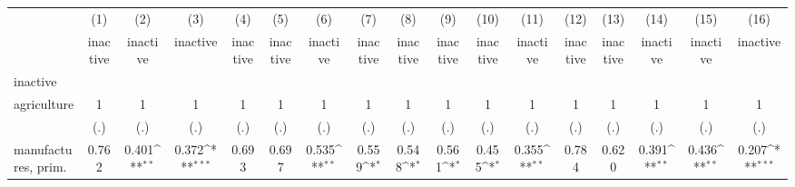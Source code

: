 {
\def\sym#1{\ifmmode^{#1}\else\(^{#1}\)\fi}
\begin{tabular}{l*{16}{c}}
\hline\hline
                    &\multicolumn{1}{c}{(1)}&\multicolumn{1}{c}{(2)}&\multicolumn{1}{c}{(3)}&\multicolumn{1}{c}{(4)}&\multicolumn{1}{c}{(5)}&\multicolumn{1}{c}{(6)}&\multicolumn{1}{c}{(7)}&\multicolumn{1}{c}{(8)}&\multicolumn{1}{c}{(9)}&\multicolumn{1}{c}{(10)}&\multicolumn{1}{c}{(11)}&\multicolumn{1}{c}{(12)}&\multicolumn{1}{c}{(13)}&\multicolumn{1}{c}{(14)}&\multicolumn{1}{c}{(15)}&\multicolumn{1}{c}{(16)}\\
                    &\multicolumn{1}{c}{inactive}&\multicolumn{1}{c}{inactive}&\multicolumn{1}{c}{inactive}&\multicolumn{1}{c}{inactive}&\multicolumn{1}{c}{inactive}&\multicolumn{1}{c}{inactive}&\multicolumn{1}{c}{inactive}&\multicolumn{1}{c}{inactive}&\multicolumn{1}{c}{inactive}&\multicolumn{1}{c}{inactive}&\multicolumn{1}{c}{inactive}&\multicolumn{1}{c}{inactive}&\multicolumn{1}{c}{inactive}&\multicolumn{1}{c}{inactive}&\multicolumn{1}{c}{inactive}&\multicolumn{1}{c}{inactive}\\
\hline
inactive            &                     &                     &                     &                     &                     &                     &                     &                     &                     &                     &                     &                     &                     &                     &                     &                     \\
agriculture         &           1         &           1         &           1         &           1         &           1         &           1         &           1         &           1         &           1         &           1         &           1         &           1         &           1         &           1         &           1         &           1         \\
                    &         (.)         &         (.)         &         (.)         &         (.)         &         (.)         &         (.)         &         (.)         &         (.)         &         (.)         &         (.)         &         (.)         &         (.)         &         (.)         &         (.)         &         (.)         &         (.)         \\
[1em]
manufactures, prim. &       0.762         &       0.401\sym{**} &       0.372\sym{***}&       0.693         &       0.697         &       0.535\sym{**} &       0.559\sym{*}  &       0.548\sym{*}  &       0.561\sym{*}  &       0.455\sym{*}  &       0.355\sym{**} &       0.784         &       0.620         &       0.391\sym{**} &       0.436\sym{**} &       0.207\sym{***}\\

\end{tabular}}
